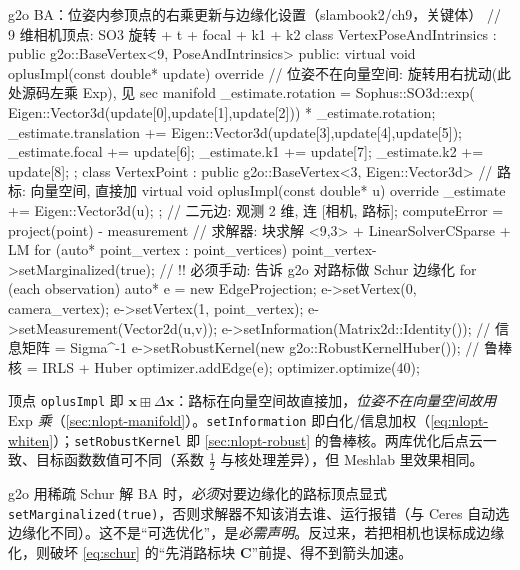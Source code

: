 \begin{codebox}[C++]{g2o BA：位姿内参顶点的右乘更新与边缘化设置（slambook2/ch9，关键体）}
// 9 维相机顶点: SO3 旋转 + t + focal + k1 + k2
class VertexPoseAndIntrinsics : public g2o::BaseVertex<9, PoseAndIntrinsics> {
public:
  virtual void oplusImpl(const double* update) override {
    // 位姿不在向量空间: 旋转用右扰动(此处源码左乘 Exp), 见 sec manifold
    _estimate.rotation = Sophus::SO3d::exp(
        Eigen::Vector3d(update[0],update[1],update[2])) * _estimate.rotation;
    _estimate.translation += Eigen::Vector3d(update[3],update[4],update[5]);
    _estimate.focal += update[6]; _estimate.k1 += update[7]; _estimate.k2 += update[8];
  }
};
class VertexPoint : public g2o::BaseVertex<3, Eigen::Vector3d> {   // 路标: 向量空间, 直接加
  virtual void oplusImpl(const double* u) override { _estimate += Eigen::Vector3d(u); }
};
// 二元边: 观测 2 维, 连 [相机, 路标]; computeError = project(point) - measurement
// 求解器: 块求解 <9,3> + LinearSolverCSparse + LM
for (auto* point_vertex : point_vertices)
  point_vertex->setMarginalized(true);     // !! 必须手动: 告诉 g2o 对路标做 Schur 边缘化
for (each observation) {
  auto* e = new EdgeProjection;
  e->setVertex(0, camera_vertex); e->setVertex(1, point_vertex);
  e->setMeasurement(Vector2d(u,v));
  e->setInformation(Matrix2d::Identity());           // 信息矩阵 = Sigma^-1
  e->setRobustKernel(new g2o::RobustKernelHuber());  // 鲁棒核 = IRLS + Huber
  optimizer.addEdge(e);
}
optimizer.optimize(40);
\end{codebox}

\noindent 顶点 \texttt{oplusImpl} 即 $\mathbf{x}\boxplus\Delta\mathbf{x}$：路标在向量空间故直接加，\emph{位姿不在向量空间故用 $\mathrm{Exp}$ 乘}（\cref{sec:nlopt-manifold}）。\texttt{setInformation} 即白化/信息加权（\cref{eq:nlopt-whiten}）；\texttt{setRobustKernel} 即 \cref{sec:nlopt-robust} 的鲁棒核。两库优化后点云一致、目标函数数值可不同（系数 $\tfrac12$ 与核处理差异），但 Meshlab 里效果相同。

\begin{pitfall}
g2o 用稀疏 Schur 解 BA 时，\emph{必须}对要边缘化的路标顶点显式 \texttt{setMarginalized(true)}，否则求解器不知该消去谁、运行报错（与 Ceres 自动选边缘化不同）。这不是“可选优化”，是\emph{必需声明}。反过来，若把相机也误标成边缘化，则破坏 \cref{eq:schur} 的“先消路标块 $\mathbf{C}$”前提、得不到箭头加速。
\end{pitfall}

